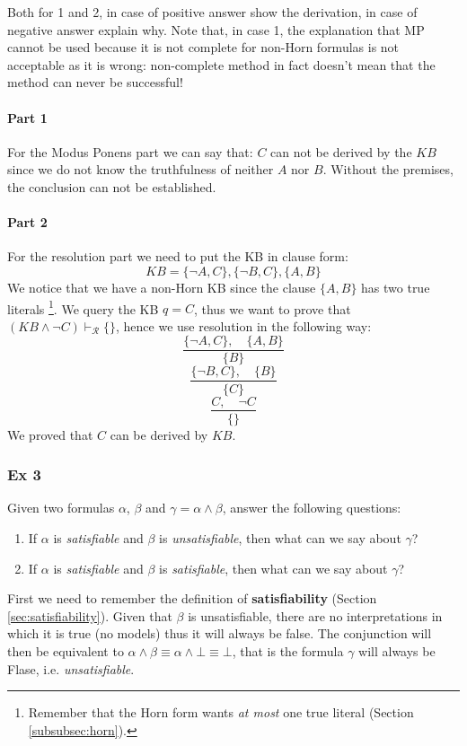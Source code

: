 \documentclass[10pt,a4paper]{article}
\begin{document}
\begin{itemize}
Both for 1 and 2, in case of positive answer show the derivation, in case of negative answer explain why.
Note that, in case 1, the explanation that MP cannot be used because it is not complete for non-Horn formulas is not acceptable as it is wrong: non-complete method in fact doesn’t mean that the method can never be successful!\\

\paragraph{Part 1}
For the Modus Ponens part we can say that: $C$ can not be derived by the $KB$ since we do not know the truthfulness of neither $A$ nor $B$. Without the premises, the conclusion can not be established.

\paragraph{Part 2}

For the resolution part we need to  put the KB in clause form:
\[KB= \{\neg A,C\},\{\neg B,C\},\{A,B\}\]
We notice that we have a non-Horn KB since the clause $\lbrace A,B \rbrace$ has two true literals \footnote{Remember that the Horn form wants \textit{at most} one true literal (Section \ref{subsubsec:horn}).}. We query the KB $q=C$, thus we want to prove that $(KB \wedge \neg C)\vdash_{\mathcal{R}}\lbrace\rbrace$, hence we use resolution in the following way:
\[\frac{\lbrace \neg A,C\rbrace,\quad \lbrace  A,B \rbrace}{\{B\}}\]
\[\frac{\lbrace \neg B,C\rbrace,\quad \lbrace  B \rbrace}{\{C\}}\]
\[\frac{ C,\quad \neg C }{\{\}}\]
We proved that $C$  can be derived by $KB$.

\subsubsection{Ex 3}

Given two formulas $\alpha$, $\beta$ and $\gamma=\alpha \wedge \beta$, answer the following questions:
\begin{enumerate}
\item If $\alpha$ is \textit{satisfiable} and $\beta$ is \textit{unsatisfiable}, then what can we say about $\gamma$?
\item If $\alpha$ is \textit{satisfiable} and $\beta$ is \textit{satisfiable}, then what can we say about $\gamma$?\end{enumerate}

First we need to remember the definition of \textbf{satisfiability} (Section \ref{sec:satisfiability}). Given that $\beta$ is unsatisfiable, there are no interpretations in which it is true (no models) thus it will always be false. The conjunction will then be equivalent to $\alpha \wedge\beta \equiv \alpha \wedge \bot\equiv \bot$, that is the formula $\gamma$ will always be Flase, i.e. \textit{unsatisfiable}.\\


\end{itemize}
\end{document}
